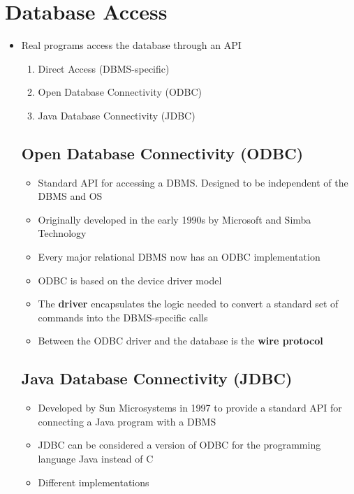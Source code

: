 \documentclass[11pt]{article}
\begin{document}
\maketitle
\thispagestyle{plain}

\section{Database Access}
\begin{itemize}
    \item Real programs access the database through an API
    \begin{enumerate}
        \item Direct Access (DBMS-specific)
        \item Open Database Connectivity (ODBC)
        \item Java Database Connectivity (JDBC)
    \end{enumerate}

    \subsection*{Open Database Connectivity (ODBC)}
    \begin{itemize}
        \item Standard API for accessing a DBMS. Designed to be independent of the DBMS and OS
        \item Originally developed in the early 1990s by Microsoft and Simba Technology
        \item Every major relational DBMS now has an ODBC implementation
        \item ODBC is based on the device driver model
        \item The \textbf{driver} encapsulates the logic needed to convert a standard set of commands into the DBMS-specific calls
        \item Between the ODBC driver and the database is the \textbf{wire protocol}
    \end{itemize}

    \subsection*{Java Database Connectivity (JDBC)}
    \begin{itemize}
        \item Developed by Sun Microsystems in 1997 to provide a standard API for connecting a Java program with a DBMS
        \item JDBC can be considered a version of ODBC for the programming language Java instead of C
        \item Different implementations


\end{itemize}
\end{itemize}
\end{document}
